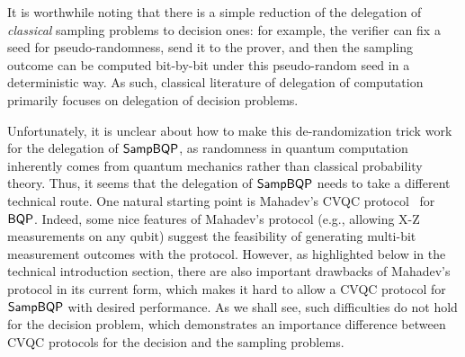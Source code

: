 It is worthwhile noting that there is a simple reduction of the delegation of \emph{classical} sampling problems to decision ones: for example, the verifier can fix a seed for pseudo-randomness, send it to the prover, and then the sampling outcome can be computed  bit-by-bit under this pseudo-random seed in a deterministic way. As such, classical literature of delegation of computation primarily focuses on delegation of decision problems. %

Unfortunately, it is unclear about how to make this de-randomization trick work for the delegation of $\operatorname{\mathsf{SampBQP}}$, 
as randomness in quantum computation inherently comes from quantum mechanics rather than classical probability theory. 
Thus, it seems that the delegation of $\operatorname{\mathsf{SampBQP}}$ needs to take a different technical route.
%
One natural starting point is Mahadev's CVQC protocol~\cite{FOCS:Mahadev18a} for $\operatorname{\mathsf{BQP}}$. 
Indeed, some nice features of Mahadev's protocol (e.g., allowing X-Z measurements on any qubit) suggest the feasibility of generating  multi-bit measurement outcomes with the protocol. 
However, as highlighted below in the technical introduction section, there are also important drawbacks of Mahadev's protocol in its current form, which makes it hard to allow a CVQC protocol for $\operatorname{\mathsf{SampBQP}}$ with desired performance. As we shall see, such difficulties do not hold for the decision problem, which demonstrates an importance difference between CVQC protocols for the decision and the sampling problems. 




